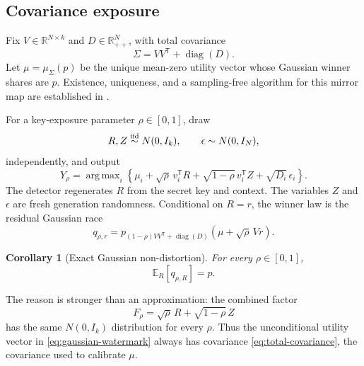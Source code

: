 \documentclass[11pt]{article}
\newtheorem{corollary}[theorem]{Corollary}
\theoremstyle{definition}
\theoremstyle{remark}
\DeclareMathOperator{\diag}{diag}
\DeclareMathOperator*{\argmax}{arg\,max}
\newcommand{\R}{\mathbb{R}}
\newcommand{\E}{\mathbb{E}}
\newcommand{\trans}{\mathsf{T}}
\begin{document}
\subsection{Covariance exposure}

Fix $V\in\R^{N\times k}$ and $D\in\R_{++}^N$, with total covariance
\begin{equation}
\Sigma=VV^\trans+\diag(D).
\label{eq:total-covariance}
\end{equation}
Let $\mu=\mu_\Sigma(p)$ be the unique mean-zero utility vector whose Gaussian winner shares are $p$. Existence, uniqueness, and a sampling-free algorithm for this mirror map are established in \citet{cotton2026calibration}.

For a key-exposure parameter $\rho\in[0,1]$, draw
\begin{equation}
R,Z\stackrel{\rm iid}{\sim}N(0,I_k),
\qquad
\epsilon\sim N(0,I_N),
\label{eq:gaussian-draws}
\end{equation}
independently, and output
\begin{equation}
Y_\rho
=\argmax_i\left\{
\mu_i+\sqrt{\rho}\,v_i^\trans R
+\sqrt{1-\rho}\,v_i^\trans Z
+\sqrt{D_i}\,\epsilon_i
\right\}.
\label{eq:gaussian-watermark}
\end{equation}
The detector regenerates $R$ from the secret key and context. The variables $Z$ and $\epsilon$ are fresh generation randomness. Conditional on $R=r$, the winner law is the residual Gaussian race
\begin{equation}
q_{\rho,r}
=p_{(1-\rho)VV^\trans+\diag(D)}
\left(\mu+\sqrt{\rho}\,Vr\right).
\label{eq:conditional-gaussian-q}
\end{equation}

\begin{corollary}[Exact Gaussian non-distortion]
\label{cor:gaussian-nondist}
For every $\rho\in[0,1]$,
\begin{equation}
\E_R[q_{\rho,R}]=p.
\label{eq:gaussian-nondist}
\end{equation}
\end{corollary}

The reason is stronger than an approximation: the combined factor
\begin{equation}
F_\rho=\sqrt{\rho}\,R+\sqrt{1-\rho}\,Z
\end{equation}
has the same $N(0,I_k)$ distribution for every $\rho$. Thus the unconditional utility vector in \eqref{eq:gaussian-watermark} always has covariance \eqref{eq:total-covariance}, the covariance used to calibrate $\mu$.
\end{document}
